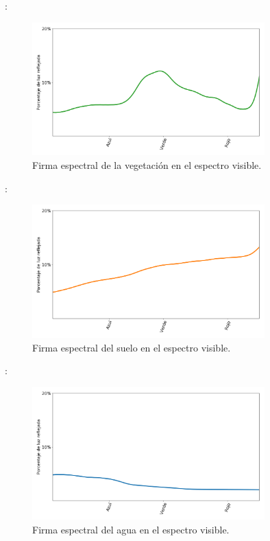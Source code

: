 \documentclass[aspectratio=169]{beamer}
\begin{document}
\begin{frame}{\secname : \subsecname}
    \begin{figure}[h!]
        \centering
        \includegraphics[width=0.8\textwidth]{fig:v.png}
        \caption{Firma espectral de la vegetación en el espectro visible.}
        \label{fig:v}
    \end{figure}
\end{frame}

\begin{frame}{\secname : \subsecname}
    \begin{figure}[h!]
        \centering
        \includegraphics[width=0.8\textwidth]{fig:s.png}
        \caption{Firma espectral del suelo en el espectro visible.}
        \label{fig:s}
    \end{figure}
\end{frame}

\begin{frame}{\secname : \subsecname}
    \begin{figure}[h!]
        \centering
        \includegraphics[width=0.8\textwidth]{fig:a.png}
        \caption{Firma espectral del agua en el espectro visible.}
        \label{fig:a}
    \end{figure}
\end{frame}
\end{document}
